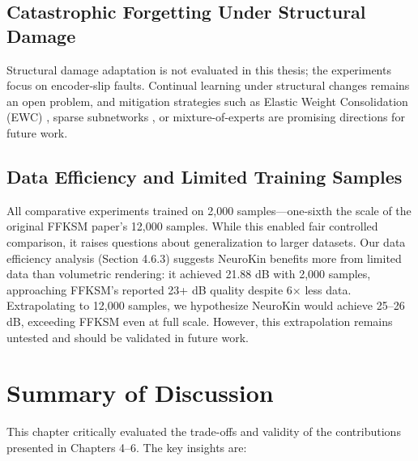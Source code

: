 \documentclass[12pt,a4paper,oneside]{report}
\begin{document}
\subsection{Catastrophic Forgetting Under Structural Damage}

Structural damage adaptation is not evaluated in this thesis; the experiments focus on encoder-slip faults. Continual learning under structural changes remains an open problem, and mitigation strategies such as Elastic Weight Consolidation (EWC) \cite{kirkpatrick2017overcoming}, sparse subnetworks \cite{frankle2018lottery}, or mixture-of-experts \cite{mocanu2018scalable} are promising directions for future work.

\subsection{Data Efficiency and Limited Training Samples}

All comparative experiments trained on 2,000 samples—one-sixth the scale of the original FFKSM paper's 12,000 samples. While this enabled fair controlled comparison, it raises questions about generalization to larger datasets. Our data efficiency analysis (Section 4.6.3) suggests NeuroKin benefits more from limited data than volumetric rendering: it achieved 21.88 dB with 2,000 samples, approaching FFKSM's reported 23+ dB quality despite 6× less data. Extrapolating to 12,000 samples, we hypothesize NeuroKin would achieve 25–26 dB, exceeding FFKSM even at full scale. However, this extrapolation remains untested and should be validated in future work.

\section{Summary of Discussion}

This chapter critically evaluated the trade-offs and validity of the contributions presented in Chapters 4–6. The key insights are:
\end{document}
